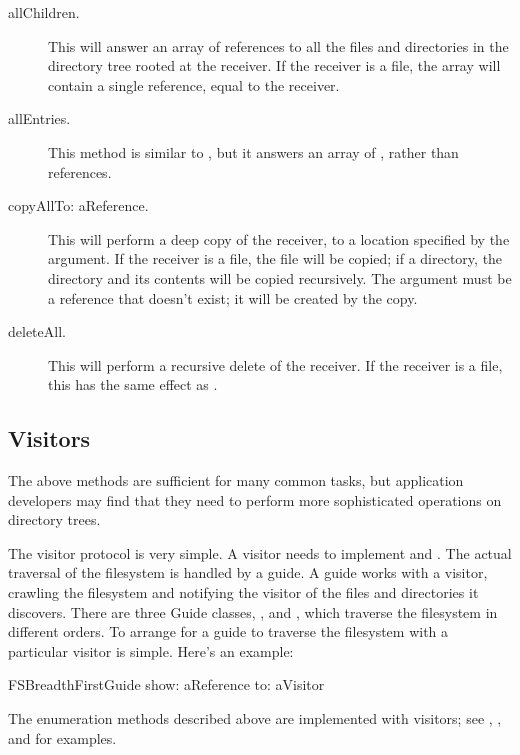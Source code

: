 \documentclass[a4paper,10pt,twoside]{book}
\begin{document}
\begin{description}
\item[allChildren.]

This will answer an array of references to all the files and directories in the directory tree rooted at the receiver. If the receiver is a file, the array will contain a single reference, equal to the receiver.

\item[allEntries.]
This method is similar to , but it answers an array of , rather than references.

\item[copyAllTo: aReference.]

This will perform a deep copy of the receiver, to a location specified by the argument. If the receiver is a file, the file will be copied; if a directory, the directory and its contents will be copied recursively. The argument must be a reference that doesn't exist; it will be created by the copy.

\item[deleteAll.]

This will perform a recursive delete of the receiver. If the receiver is a file, this has the same effect as .
\end{description}

\subsection{Visitors}

The above methods are sufficient for many common tasks, but application developers may find that they need to perform more sophisticated operations on directory trees.

The visitor protocol is very simple. A visitor needs to implement  and . The actual traversal of the filesystem is handled by a guide. A guide works with a visitor, crawling the filesystem and notifying the visitor of the files and directories it discovers. There are three Guide classes, ,  and  , which traverse the filesystem in different orders. To arrange for a guide to traverse the filesystem with a particular visitor is simple. Here's an example:

\begin{code}{}
    FSBreadthFirstGuide show: aReference to: aVisitor
\end{code}	

The enumeration methods described above are implemented with visitors; see , , and  for examples.



\ifx\wholebook\relax\else
   
   
\end{document}
